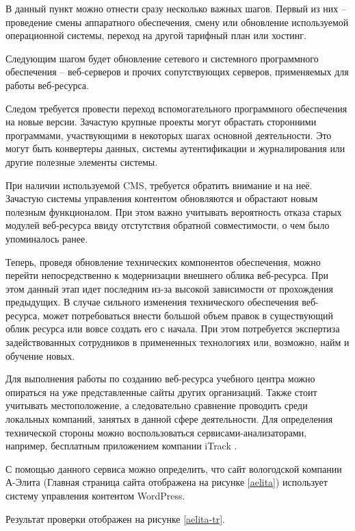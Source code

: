 В данный пункт можно отнести сразу несколько важных шагов.
Первый из них -- проведение смены аппаратного обеспечения, смену или обновление используемой операционной системы, переход на другой тарифный план или хостинг.

Следующим шагом будет обновление сетевого и системного программного обеспечения -- веб-серверов и прочих сопутствующих серверов, применяемых для работы веб-ресурса.

Следом требуется провести переход вспомогательного программного обеспечения на новые версии.
Зачастую крупные проекты могут обрастать сторонними программами, участвующими в некоторых шагах основной деятельности.
Это могут быть конвертеры данных, системы аутентификации и журналирования или другие полезные элементы системы.

При наличии используемой CMS, требуется обратить внимание и на неё.
Зачастую системы управления контентом обновляются и обрастают новым полезным функционалом.
При этом важно учитывать вероятность отказа старых модулей веб-ресурса ввиду отстутствия обратной совместимости, о чем было упоминалось ранее.

Теперь, проведя обновление технических компонентов обеспечения, можно перейти непосредственно к модернизации внешнего облика веб-ресурса.
При этом данный этап идет последним из-за высокой зависимости от прохождения предыдущих.
В случае сильного изменения технического обеспечения веб-ресурса, может потребоваться внести большой объем правок в существующий облик ресурса или вовсе создать его с начала.
При этом потребуется экспертиза задействованных сотрудников в примененных технологиях или, возможно, найм и обучение новых.

Для выполнения работы по созданию веб-ресурса учебного центра можно опираться на уже представленные сайты других организаций.
Также стоит учитывать местоположение, а следовательно сравнение проводить среди локальных компаний, занятых в данной сфере деятельности.
Для определения технической стороны можно воспользоваться сервисами-анализаторами, например, бесплатным приложением компании iTrack \cite{iTrack}.

С помощью данного сервиса можно определить, что сайт вологодской компании А-Элита \cite{aelita} (Главная страница сайта отображена на рисунке \ref{aelita}) использует систему управления контентом WordPress.


Результат проверки отображен на рисунке \ref{aelita-tr}.

